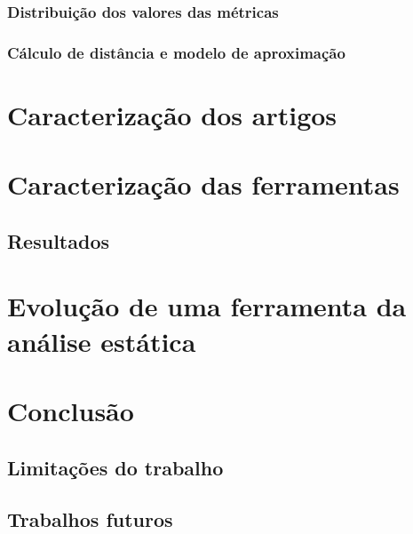 \documentclass[qual, classic, a4paper]{ufbathesis}
\begin{document}
\subsection{Distribuição dos valores das métricas}

\subsection{Cálculo de distância e modelo de aproximação}

\chapter{Caracterização dos artigos}

\chapter{Caracterização das ferramentas}

\section{Resultados}

\chapter{Evolução de uma ferramenta da análise estática}

\chapter{Conclusão}

\section{Limitações do trabalho}

\section{Trabalhos futuros}

\backmatter
\appendix

\end{document}
